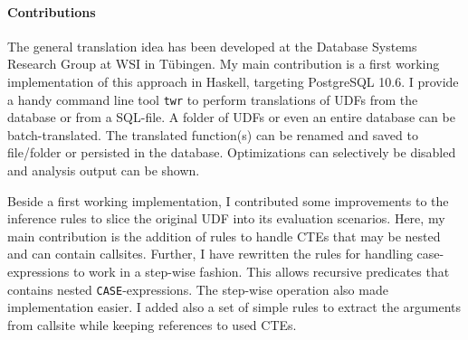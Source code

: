 
    
\paragraph*{Contributions} The general translation idea has been developed at the Database Systems Research Group at WSI in Tübingen. My main contribution is a first working implementation of this approach in Haskell, targeting PostgreSQL 10.6. I provide a handy command line tool \texttt{twr} to perform translations of UDFs from the database or from a SQL-file. A folder of UDFs or even an entire database can be batch-translated. The translated function(s) can be renamed and saved to file/folder or persisted in the database. Optimizations can selectively be disabled and analysis output can be shown.

Beside a first working implementation, I contributed some improvements to the inference rules to slice the original UDF into its evaluation scenarios. Here, my main contribution is the addition of rules to handle CTEs that may be nested and can contain callsites. Further, I have rewritten the rules for handling case-expressions to work in a step-wise fashion. This allows recursive predicates that contains nested \texttt{CASE}-expressions. The step-wise operation also made implementation easier. I added also a set of simple rules to extract the arguments from callsite while keeping references to used CTEs.

